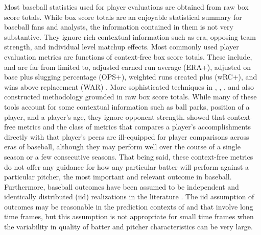 \documentclass[12pt]{article}
\begin{document}
Most baseball statistics used for player evaluations are obtained from raw box score totals. While box score totals are an enjoyable statistical summary for baseball fans and analysts, the information contained in them is not very substantive. They ignore rich contextual information such as era, opposing team strength, and individual level matchup effects. Most commonly used player evaluation metrics are functions of context-free box score totals. These include, and are far from limited to, adjusted earned run average (ERA+), adjusted on base plus slugging percentage (OPS+), weighted runs created plus (wRC+), and wins above replacement (WAR) \citep{bref, fangraphs}. More sophisticated techniques in \citet{berry1999bridging}, \citet{brown2008season}, \cite{jensen2009hierarchical}, and \cite{baumer2015openwar} also constructed methodology grounded in raw box score totals. While many of these tools account for some contextual information such as ball parks, position of a player, and a player's age, they ignore opponent strength. %
\cite{eck2020challenging} showed that context-free metrics and the class of metrics that compares a player's accomplishments directly with that player's peers are ill-equipped for player comparisons across eras of baseball, although they may perform well over the course of a single season or a few consecutive seasons. That being said, these context-free metrics do not offer any guidance for how any particular batter will perform against a particular pitcher, the most important and relevant outcome in baseball. Furthermore, baseball outcomes have been assumed to be independent and identically distributed (iid) realizations in the literature \citep{brown2008season, jensen2009hierarchical}. The iid assumption of outcomes may be reasonable in the prediction contexts of \cite{brown2008season} and \cite{jensen2009hierarchical} that involve long time frames, but this assumption is not appropriate for small time frames when the variability in quality of batter and pitcher characteristics can be very large.




%
\end{document}
